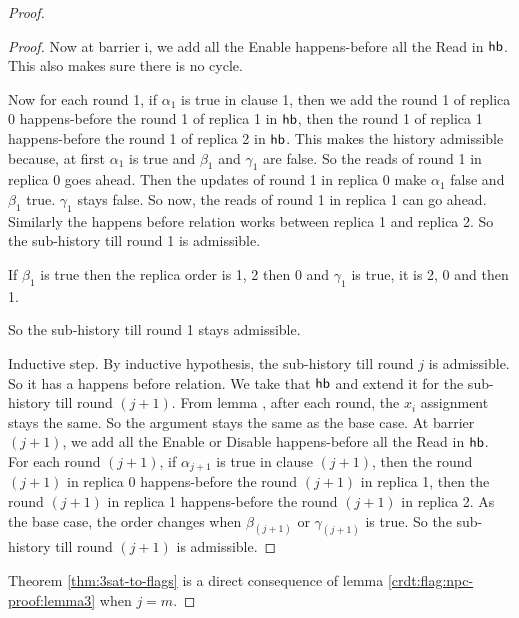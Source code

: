 \begin{proof}
\begin{proof}
    Now at barrier i, we add all the \textrm{Enable} happens-before all the \textrm{Read} in $\textsf{hb}$. This also makes sure there is no cycle.

    Now for each round 1, if $\alpha_1$ is true in clause 1, then we add the round 1 of replica 0 happens-before the round 1 of replica 1 in $\textsf{hb}$, then the round 1 of replica 1 happens-before the round 1 of replica 2 in $\textsf{hb}$. This makes the history admissible because, at first $\alpha_1$ is true and $\beta_1$ and $\gamma_1$ are false. So the reads of round 1 in replica 0 goes ahead. Then the updates of round 1 in replica 0 make $\alpha_1$ false and $\beta_1$ true. $\gamma_1$ stays false. So now, the reads of round 1 in replica 1 can go ahead. Similarly the happens before relation works between replica 1 and replica 2. So the sub-history till round 1 is admissible.
    
    If $\beta_1$ is true then the replica order is 1, 2 then 0 and $\gamma_1$ is true, it is 2, 0 and then 1.
    
    So the sub-history till round 1 stays admissible.

    Inductive step. By inductive hypothesis, the sub-history till round $j$ is admissible. So it has a happens before relation. We take that $\textsf{hb}$ and extend it for the sub-history till round $(j+1)$. From lemma \label{crdt:flag:npc-proof:lemma2}, after each round, the $x_i$ assignment stays the same. So the argument stays the same as the base case. At barrier $(j+1)$, we add all the \textrm{Enable} or \textrm{Disable} happens-before all the \textrm{Read} in $\textsf{hb}$. For each round $(j+1)$, if $\alpha_{j+1}$ is true in clause $(j+1)$, then the round $(j+1)$ in replica 0 happens-before the round $(j+1)$ in replica 1, then the round $(j+1)$ in replica 1 happens-before the round $(j+1)$ in replica 2. As the base case, the order changes when $\beta_(j+1)$ or $\gamma_(j+1)$ is true. So the sub-history till round $(j+1)$ is admissible.
  \end{proof}

Theorem \ref{thm:3sat-to-flags} is a direct consequence of lemma \ref{crdt:flag:npc-proof:lemma3} when $j = m$. 



\end{proof}
